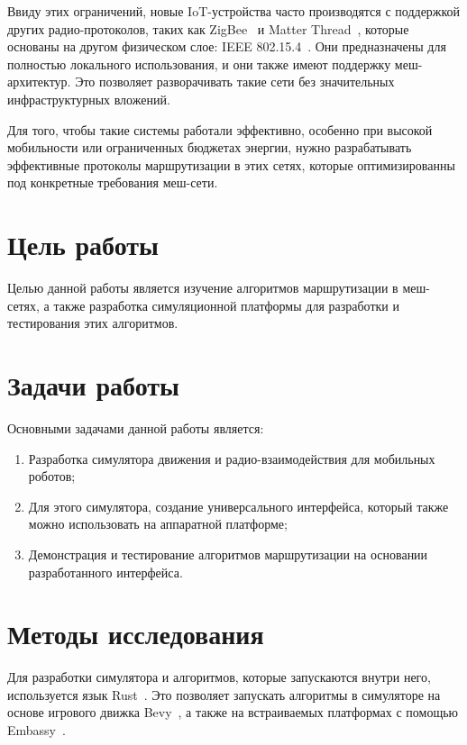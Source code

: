 \documentclass[%
]{report}
\begin{document}
Ввиду этих ограничений, новые IoT-устройства часто производятся с поддержкой других
радио-протоколов, таких как ZigBee~\cite{zigbee-792946} и Matter Thread~\cite{csa2023thread},
которые основаны на другом физическом слое: IEEE 802.15.4~\cite{ieee-lorawan-9144691}.
Они предназначены для полностью локального использования,
и они также имеют поддержку меш-архитектур.
Это позволяет разворачивать такие сети без значительных инфраструктурных вложений.

Для того, чтобы такие системы работали эффективно,
особенно при высокой мобильности или ограниченных бюджетах энергии,
нужно разрабатывать эффективные протоколы маршрутизации в этих сетях,
которые оптимизированны под конкретные требования меш-сети.

\section{Цель работы}

Целью данной работы является изучение алгоритмов маршрутизации в меш-сетях,
а также разработка симуляционной платформы для разработки и тестирования этих алгоритмов.

\section{Задачи работы}

Основными задачами данной работы является:

\begin{enumerate}
  \item Разработка симулятора движения и радио-взаимодействия для мобильных роботов;
  \item Для этого симулятора, создание универсального интерфейса,
  который также можно использовать на аппаратной платформе;
  \item Демонстрация и тестирование алгоритмов маршрутизации на основании разработанного интерфейса.
\end{enumerate}

\section{Методы исследования}

Для разработки симулятора и алгоритмов, которые запускаются внутри него,
используется язык Rust~\cite{klabnik2022rust,10.1145/2692956.2663188}.
Это позволяет запускать алгоритмы в симуляторе на основе игрового движка Bevy~\cite{bevyengine},
а также на встраиваемых платформах с помощью Embassy~\cite{embassy}.
\end{document}
